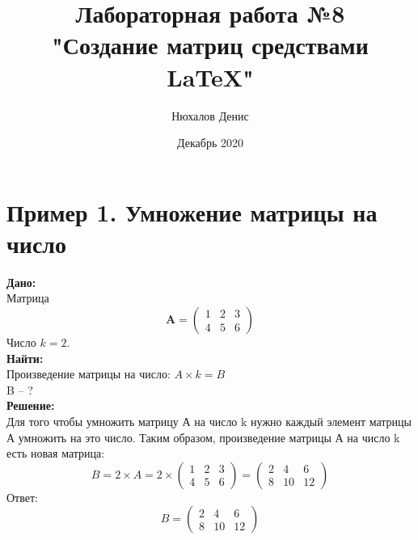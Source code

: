 \documentclass[a4paper,12pt]{article} %
\author{Нюхалов Денис}
\title{Лабораторная работа №8\\"Создание матриц средствами \LaTeX{}"}
\date{Декабрь 2020}
\begin{document}

\maketitle
\newpage

\section{Пример 1. Умножение матрицы на число}

\textbf{Дано:} \\
Матрица
\begin{displaymath}
\mathbf{A} =
\left( \begin{array}{ccc}
1 & 2 & 3\\
4 & 5 & 6 
\end{array} \right)
\end{displaymath}
Число $k=2$.\\
\textbf{Найти:}\\
Произведение матрицы на число: $A\times k=B$\\
B -- ?\\
\textbf{Решение:}\\
Для того чтобы умножить матрицу А на число k нужно каждый элемент матрицы А умножить на это число.
Таким образом, произведение матрицы А на число k есть новая матрица:
\begin{displaymath}
B = 2\times A = 2\times
\begin{pmatrix}
1 & 2 & 3\\
4 & 5 & 6 
\end{pmatrix}= 
\begin{pmatrix}
2 & 4 & 6\\
8 & 10 & 12 
\end{pmatrix}
\end{displaymath}
Ответ:
\begin{displaymath}
B = \begin{pmatrix}
2 & 4 & 6\\
8 & 10 & 12 
\end{pmatrix}
\end{displaymath}
\end{document}
